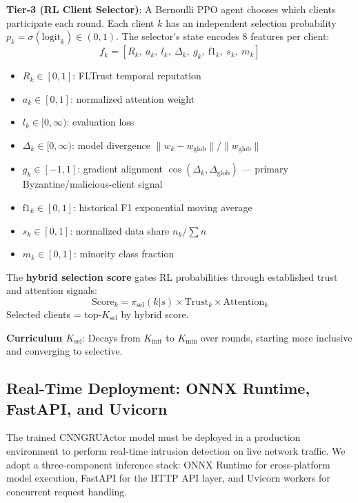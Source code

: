 \documentclass[conference]{IEEEtran}
\begin{document}
\textbf{Tier-3 (RL Client Selector)}: A Bernoulli PPO agent chooses which clients participate each round. Each client $k$ has an independent selection probability $p_k = \sigma(\mathrm{logit}_k) \in (0,1)$. The selector's state encodes 8 features per client:
\begin{equation}
f_k = [R_k,\ a_k,\ l_k,\ \Delta_k,\ g_k,\ \mathrm{f1}_k,\ s_k,\ m_k]
\end{equation}
\begin{itemize}
    \item $R_k \in [0,1]$: FLTrust temporal reputation
    \item $a_k \in [0,1]$: normalized attention weight
    \item $l_k \in [0,\infty)$: evaluation loss
    \item $\Delta_k \in [0,\infty)$: model divergence $\|w_k - w_{\mathrm{glob}}\|/\|w_{\mathrm{glob}}\|$
    \item $g_k \in [-1,1]$: gradient alignment $\cos(\Delta_k, \Delta_{\mathrm{glob}})$ --- primary Byzantine/malicious-client signal
    \item $\mathrm{f1}_k \in [0,1]$: historical F1 exponential moving average
    \item $s_k \in [0,1]$: normalized data share $n_k / \sum n$
    \item $m_k \in [0,1]$: minority class fraction
\end{itemize}

The \textbf{hybrid selection score} gates RL probabilities through established trust and attention signals:
\begin{equation}
\mathrm{Score}_k = \pi_{\mathrm{sel}}(k|s) \times \mathrm{Trust}_k \times \mathrm{Attention}_k
\end{equation}
Selected clients = top-$K_{\mathrm{sel}}$ by hybrid score.

\textbf{Curriculum $K_{\mathrm{sel}}$}: Decays from $K_{\mathrm{init}}$ to $K_{\min}$ over rounds, starting more inclusive and converging to selective.

\subsection{Real-Time Deployment: ONNX Runtime, FastAPI, and Uvicorn}
\label{sec:deployment}

The trained CNNGRUActor model must be deployed in a production environment to perform real-time intrusion detection on live network traffic. We adopt a three-component inference stack: ONNX Runtime for cross-platform model execution, FastAPI for the HTTP API layer, and Uvicorn workers for concurrent request handling.
\end{document}
